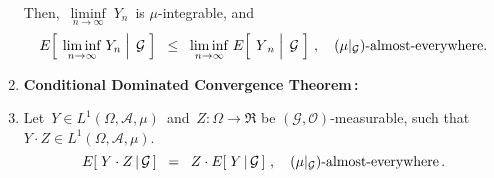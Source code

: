 \begin{theorem}
\begin{enumerate}
	Then,
	\,$\underset{n\rightarrow\infty}{\liminf}\;Y_{n}$\, is $\mu$-integrable, and
	\begin{equation*}
	E\!\left[\;\left.\underset{n\rightarrow\infty}{\liminf}\;Y_{n}\;\right\vert\;\mathcal{G}\;\right]
	\;\;\leq\;\;
	\underset{n\rightarrow\infty}{\liminf}\; E\!\left[\;\left.\overset{{\color{white}.}}{Y}_{n}\;\right\vert\;\mathcal{G}\;\right]\,,
	\quad
	\textnormal{$(\mu\vert_{\mathcal{G}})$-almost-everywhere}.
	\end{equation*}
\item\label{ConditionalDominatedConvergence}
	\textbf{Conditional Dominated Convergence Theorem\,:}
\item\label{FactorOutWhatIsKnown}
	Let \,$Y \in L^{1}(\Omega,\mathcal{A},\mu)$\, and \,$Z : \Omega \longrightarrow \Re$ be
	$(\mathcal{G},\mathcal{O})$-measurable, such that
	\,$Y \cdot Z \in L^{1}(\Omega,\mathcal{A},\mu)$.
	\begin{equation*}
	E\!\left[\;Y \cdot Z\,\vert\,\mathcal{G}\,\right]
	\;\; = \;\;
	Z \cdot E\!\left[\;Y\,\vert\,\mathcal{G}\,\right]\,,
	\quad
	\textnormal{$(\mu\vert_{\mathcal{G}})$-almost-everywhere}\,.
	\end{equation*}
\end{enumerate}
\end{theorem}

\proof

